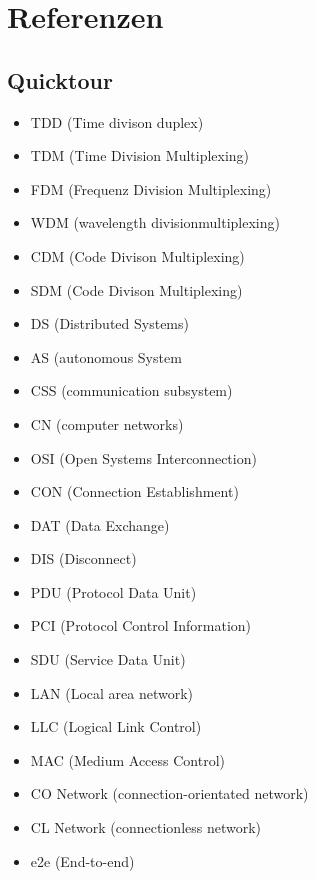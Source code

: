 \section{Referenzen}
	\subsection{Quicktour}
		\begin{itemize}
			\item TDD (Time divison duplex)
			\item TDM (Time Division Multiplexing)
			\item FDM (Frequenz Division Multiplexing)
			\item WDM (wavelength divisionmultiplexing)
			\item CDM (Code Divison Multiplexing)
			\item SDM (Code Divison Multiplexing)
			\item DS (Distributed Systems)
			\item AS (autonomous System
			\item CSS (communication subsystem)
			\item CN (computer networks)
			\item OSI (Open Systems Interconnection)
			\item CON (Connection Establishment)
			\item DAT (Data Exchange)
			\item DIS (Disconnect)
			\item PDU (Protocol Data Unit) 
			\item PCI (Protocol Control Information) 
			\item SDU (Service Data Unit)
			\item LAN (Local area network)
			\item LLC (Logical Link Control)
			\item MAC (Medium Access Control)
			\item CO Network (connection-orientated network)
			\item CL Network (connectionless network)
			\item e2e (End-to-end)
		\end{itemize}
